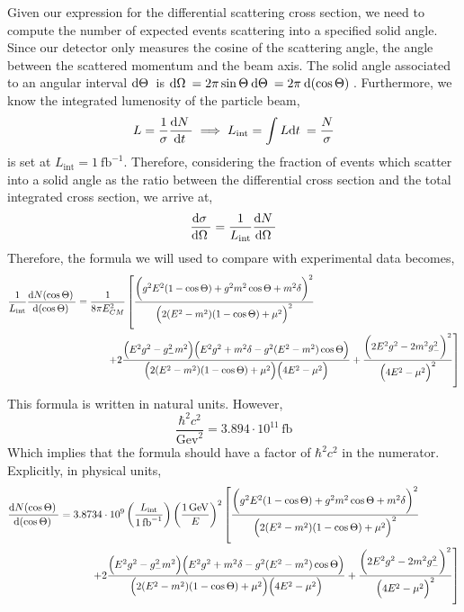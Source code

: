 \documentclass[12pt]{article}
\begin{document}
Given our expression for the differential scattering cross section, we need to compute the number of expected events scattering into a specified solid angle. Since our detector only measures the cosine of the scattering angle, the angle between the scattered momentum and the beam axis. The solid angle associated to an angular interval $\mathrm{d}\Theta \:$ is $\mathrm{d}\Omega \: = 2 \pi \sin{\Theta} \: \mathrm{d}\Theta \: = 2 \pi \: \mathrm{d} (\cos{\Theta})  \:$. 
Furthermore, we know the integrated lumenosity of the particle beam,
\[ L = \frac{1}{\sigma} \frac{\mathrm{d}N \:}{\mathrm{d}t \:} \implies L_{\text{int}} = \int L \mathrm{d}t \: = \frac{N}{\sigma} \]
is set at $L_{\text{int}} = 1 \: \mathrm{fb}^{-1}$. Therefore, considering the fraction of events which scatter into a solid angle as the ratio between the differential cross section and the total integrated cross section, we arrive at,
\[ \frac{\mathrm{d}\sigma \:}{\mathrm{d}\Omega \:} = \frac{1}{L_{\text{int}}} \frac{\mathrm{d}N \:}{\mathrm{d}\Omega \:} \]
Therefore, the formula we will used to compare with experimental data becomes,
\begin{align*}
\frac{1}{L_{\text{int}}} \frac{\mathrm{d}N( \cos{\Theta} ) \:}{\mathrm{d}(\cos{\Theta}) \:} & = \frac{1}{8 \pi E_{CM}^2}  \left[ \frac{\bigg( g^2 E^2 (1 - \cos{\Theta}) + g^2 m^2 \cos{\Theta} + m^2 \delta \bigg)^2}{\Big( 2 (E^2 - m^2) (1 - \cos{\Theta}) + \mu^2 \Big)^2} 
\right. 
\\ & \left. 
\quad \quad \quad + 2 \frac{\Big( E^2 g^2 - g_{-}^2 m^2 \Big) \Big( E^2 g^2 + m^2 \delta - g^2 (E^2 - m^2) \cos{\Theta} \Big)}{\Big( 2 (E^2 - m^2) (1 - \cos{\Theta}) + \mu^2 \Big) \Big( 4 E^2 - \mu^2 \Big) } + \frac{\bigg( 2 E^2 g^2  -2 m^2  g_{-}^2  \bigg)^2}{ \Big( 4 E^2 - \mu^2 \Big)^2} \right]
\end{align*}
This formula is written in natural units. However,
\[ \frac{\hbar^2 c^2}{\mathrm{Gev}^2} = 3.894 \cdot 10^{11} \, \mathrm{fb} \]
Which implies that the formula should have a factor of $\hbar^2 c^2$ in the numerator. Explicitly, in physical units,
\begin{align*}
\frac{\mathrm{d}N( \cos{\Theta} ) \:}{\mathrm{d}(\cos{\Theta}) \:} & = 3.8734 \cdot 10^{9} \left( \frac{L_{\text{int}}}{1 \, \text{fb}^{-1}} \right) \left( \frac{1 \, \mathrm{GeV}}{E} \right)^2 \left[ \frac{\bigg( g^2 E^2 (1 - \cos{\Theta}) + g^2 m^2 \cos{\Theta} + m^2 \delta \bigg)^2}{\Big( 2 (E^2 - m^2) (1 - \cos{\Theta}) + \mu^2 \Big)^2} 
\right. 
\\ & \left. 
\quad \quad \quad + 2 \frac{\Big( E^2 g^2 - g_{-}^2 m^2 \Big) \Big( E^2 g^2 + m^2 \delta - g^2 (E^2 - m^2) \cos{\Theta} \Big)}{\Big( 2 (E^2 - m^2) (1 - \cos{\Theta}) + \mu^2 \Big) \Big( 4 E^2 - \mu^2 \Big) } + \frac{\bigg( 2 E^2 g^2  -2 m^2  g_{-}^2  \bigg)^2}{ \Big( 4 E^2 - \mu^2 \Big)^2} \right]
\end{align*}
\end{document}
